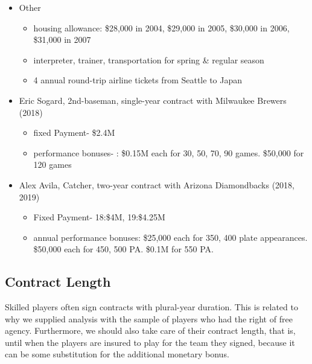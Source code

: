 \documentclass[dvipdfmx, 12pt]{article}
\begin{document}
\begin{table}
\begin{itemize}
\begin{itemize}
      \item Other

      \begin{itemize}
        \item housing allowance: \$28,000 in 2004, \$29,000 in 2005, \$30,000 in 2006, \$31,000 in 2007

        \item interpreter, trainer, transportation for spring \& regular season

        \item 4 annual round-trip airline tickets from Seattle to Japan
      \end{itemize}
    \end{itemize}
  \end{itemize}
  \begin{itemize}
    \item Eric Sogard, 2nd-baseman, single-year contract with Milwaukee Brewers (2018)
    \begin{itemize}
      \item fixed Payment- \$2.4M

      \item performance bonuses- : \$0.15M each for 30, 50, 70, 90 games. \$50,000 for 120 games
    \end{itemize}
  \end{itemize}

\begin{itemize}
  \item Alex Avila, Catcher, two-year contract with Arizona Diamondbacks (2018, 2019)

  \begin{itemize}
    \item Fixed Payment- 18:\$4M, 19:\$4.25M

    \item annual performance bonuses: \$25,000 each for 350, 400 plate appearances. \$50,000 each for 450, 500 PA. \$0.1M for 550 PA.
  \end{itemize}
\end{itemize}
\end{table}



\subsection{Contract Length}

Skilled players often sign contracts with plural-year duration. This is related to why we supplied analysis with the sample of players who had the right of free agency. Furthermore, we should also take care of their contract length, that is, until when the players are insured to play for the team they signed, because it can be some substitution for the additional monetary bonus.
\end{document}
